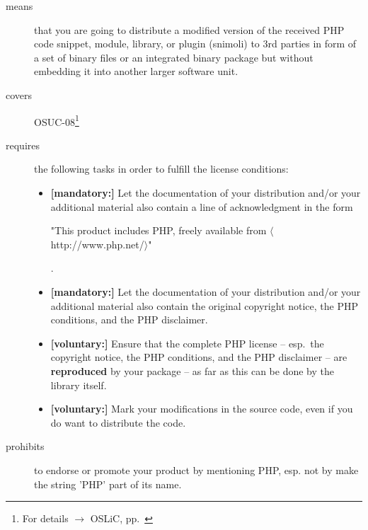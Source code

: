 \begin{description}

\item[means] that you are going to distribute a modified version of the received
PHP code snippet, module, library, or plugin (snimoli) to 3rd parties in form
of a set of binary files or an integrated binary package but without embedding
it into another larger software unit.

\item[covers] OSUC-08\footnote{For details $\rightarrow$ OSLiC, pp.\ \pageref{OSUC-08-DEF}}

\item[requires] the following tasks in order to fulfill the license conditions:
\begin{itemize}
  
  \item \textbf{[mandatory:]} Let the documentation of your distribution and/or
  your additional material also contain a line of acknowledgment in the form
  \begin{footnotesize}"This product includes PHP, freely available from
  $\langle$http://www.php.net/$\rangle$"\end{footnotesize}.
    
  \item \textbf{[mandatory:]} Let the documentation of your distribution and/or
  your additional material also contain the original copyright notice, the PHP
  conditions, and the PHP disclaimer.

  \item \textbf{[voluntary:]} Ensure that the complete PHP license -- esp.\ the
  copyright notice, the PHP conditions, and the PHP disclaimer -- are
  \textbf{reproduced} by your package -- as far as this can be done by the
  library itself.
  
  \item \textbf{[voluntary:]} Mark your modifications in the source code,
  even if you do want to distribute the code.

\end{itemize}

\item[prohibits] to endorse or promote your product by mentioning PHP, esp. not
by make the string 'PHP' part of its name.

\end{description}

